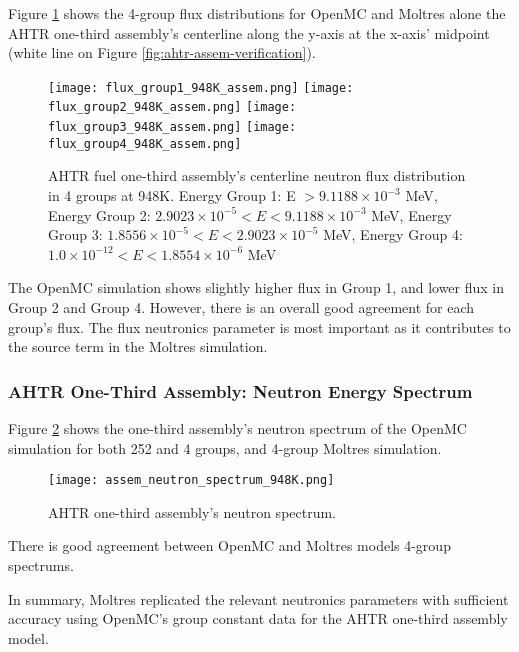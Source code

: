 Figure \ref{fig:flux_948K_assem} shows the 4-group flux distributions for OpenMC and 
Moltres alone the \gls{AHTR} one-third assembly's centerline along the y-axis at 
the x-axis' midpoint (white line on Figure \ref{fig:ahtr-assem-verification}). 
\begin{figure}[htbp]
    \centering
    \texttt{[image: flux\_group1\_948K\_assem.png]} 
    \texttt{[image: flux\_group2\_948K\_assem.png]} 
    \texttt{[image: flux\_group3\_948K\_assem.png]} 
    \texttt{[image: flux\_group4\_948K\_assem.png]} 
    \caption{AHTR fuel one-third assembly's centerline neutron flux distribution in 
    4 groups at 948K. 
    Energy Group 1: E $> 9.1188 \times 10^{-3}$ MeV, 
    Energy Group 2: $2.9023 \times 10^{-5} < E < 9.1188 \times 10^{-3}$ MeV,
    Energy Group 3:  $1.8556 \times 10^{-5} < E < 2.9023 \times 10^{-5}$ MeV,
    Energy Group 4:  $1.0 \times 10^{-12} < E < 1.8554 \times 10^{-6}$ MeV}
    \label{fig:flux_948K_assem}
\end{figure}
The OpenMC simulation shows slightly higher flux in Group 1, and lower flux in 
Group 2 and Group 4. 
However, there is an overall good agreement for each group's flux.
The flux neutronics parameter is most important as it contributes to the 
source term in the Moltres simulation. 

\subsubsection{AHTR One-Third Assembly: Neutron Energy Spectrum}
Figure \ref{fig:assem_neutron_spectrum_948K} shows the one-third assembly's neutron 
spectrum of the OpenMC simulation for both 252 and 4 groups, and 4-group Moltres 
simulation. 
 \begin{figure}[htbp]
    \centering
    \texttt{[image: assem\_neutron\_spectrum\_948K.png]}
    \caption{AHTR one-third assembly's neutron spectrum.}  
    \label{fig:assem_neutron_spectrum_948K}
\end{figure}
There is good agreement between OpenMC and Moltres models 4-group spectrums. 

In summary, Moltres replicated the relevant neutronics parameters with sufficient 
accuracy using OpenMC's group constant data for the \gls{AHTR} one-third assembly 
model. 


